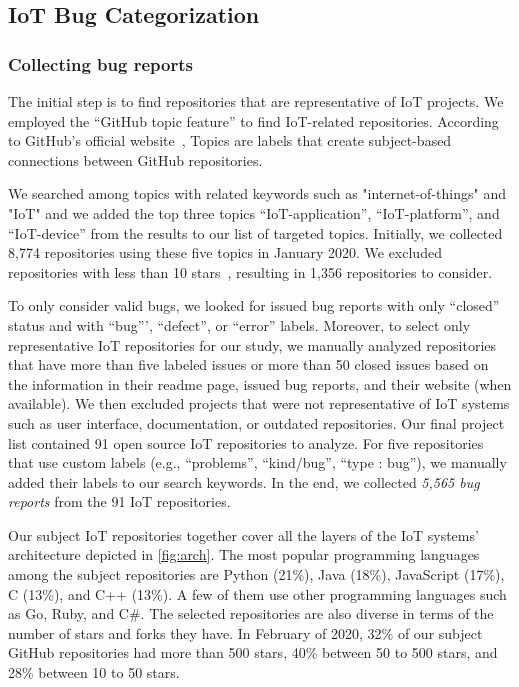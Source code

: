 \subsection{IoT Bug Categorization}
\subsubsection{Collecting bug reports} \label{bugCollection}
  The initial step is to find repositories that are representative of IoT projects. We employed the ``GitHub topic feature'' to find IoT-related repositories. According to GitHub's official website~\cite{gitTopic}, Topics are labels that create subject-based connections between GitHub repositories. 


  We searched among topics with related keywords such as "internet-of-things" and "IoT" and we added the top three topics ``IoT-application'', ``IoT-platform'', and ``IoT-device'' from the results to our list of targeted topics. Initially, we collected 8,774 repositories using these five topics in January 2020. We excluded repositories with less than 10 stars~\cite{borges2018s}, resulting in 1,356 repositories to consider. 

To only consider valid bugs, we looked for issued bug reports with only ``closed'' status and with ``bug''', ``defect'', or ``error'' labels.  Moreover, to select only representative IoT repositories for our study, we manually analyzed repositories that have more than five labeled issues or more than 50 closed issues based on the information in their readme page, issued bug reports, and their website (when available). We then excluded projects that were not representative of IoT systems such as user interface, documentation, or outdated repositories. Our final project list contained 91 open source IoT repositories to analyze. For five repositories that use custom labels (e.g., ``problems'', ``kind/bug'', ``type : bug''), we manually added their labels to our search keywords. In the end, we collected \emph{5,565 bug reports} from the 91 IoT repositories.

Our subject IoT repositories together cover all the layers of the IoT systems' architecture depicted in \autoref{fig:arch}. The most popular programming languages among the subject repositories are Python (21\%), Java (18\%), JavaScript (17\%), C (13\%), and C++ (13\%). A few of them use other programming languages such as Go, Ruby, and C\#. The selected repositories are also diverse in terms of the number of stars and forks they have. In February of 2020, 32\% of our subject GitHub repositories had more than 500 stars, 40\% between 50 to 500 stars, and 28\% between 10 to 50 stars. 

